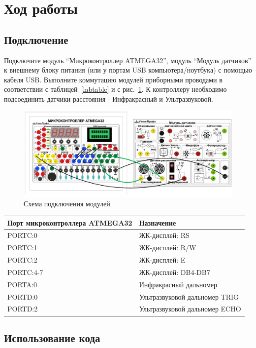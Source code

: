 \documentclass[12pt]{article}
\begin{document}
\section{Ход работы}
\subsection{Подключение}
Подключите модуль ``Микроконтроллер ATMEGA32'', модуль ``Модуль датчиков'' к внешнему блоку питания (или у портам USB компьютера/ноутбука) с помощью кабеля USB. Выполните коммутацию модулей приборными проводами в соответствии с таблицей~\ref{labtable}  и с рис.~\ref{labscheme}. К контроллеру необходимо подсоединить датчики расстояния - Инфракрасный и Ультразвуковой.

\begin{figure}[H]
	\centering
	\includegraphics[scale=0.65]{images/lab4-scheme.png}
	\caption{Схема подключения модулей}\label{labscheme}
\end{figure}
\begin{table}[H]
	\caption{Коммутация модулей}\label{labtable}
	\begin{longtable}[]{@{}l|l@{}}
		\toprule
		Порт микроконтроллера ATMEGA32 & Назначение \\
		\midrule
		\endhead
		PORTC:0 & ЖК-дисплей: RS \\
		PORTC:1 & ЖК-дисплей: R/W \\
		PORTC:2 & ЖК-дисплей: E \\
		PORTC:4-7 & ЖК-дисплей: DB4-DB7 \\
		PORTA:0 & Инфракрасный дальномер \\
		PORTD:0 & Ультразвуковой дальномер TRIG \\
		PORTD:2 & Ультразвуковой дальномер ECHO \\
		\bottomrule
	\end{longtable}  
\end{table}

\subsection{Использование кода}
\end{document}
